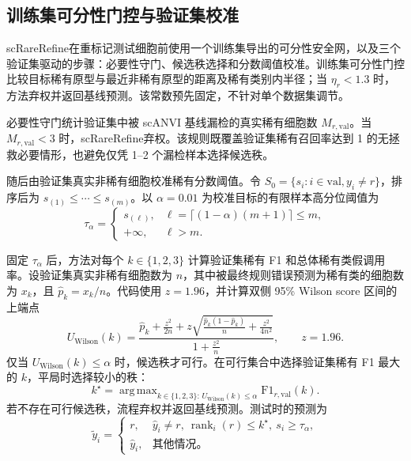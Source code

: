 \documentclass[pdflatex,sn-mathphys-num]{sn-jnl}
\theoremstyle{thmstyleone}%
\theoremstyle{thmstyletwo}%
\theoremstyle{thmstylethree}%
\newcommand{\method}{scRareRefine}
\newcommand{\rare}{r}
\newcommand{\valsplit}{\mathrm{val}}
\DeclareMathOperator*{\argmax}{arg\,max}
\begin{document}
\subsection{训练集可分性门控与验证集校准}

\method 在重标记测试细胞前使用一个训练集导出的可分性安全网，以及三个验证集驱动的步骤：必要性守门、候选秩选择和分数阈值校准。训练集可分性门控比较目标稀有原型与最近非稀有原型的距离及稀有类别内半径；当 $\eta_\rare<1.3$ 时，方法弃权并返回基线预测。该常数预先固定，不针对单个数据集调节。

必要性守门统计验证集中被 scANVI 基线漏检的真实稀有细胞数 $M_{\rare,\valsplit}$。当 $M_{\rare,\valsplit}<3$ 时，\method 弃权。该规则既覆盖验证集稀有召回率达到 1 的无拯救必要情形，也避免仅凭 1--2 个漏检样本选择候选秩。

随后由验证集真实非稀有细胞校准稀有分数阈值。令 $S_0=\{s_i:i\in\valsplit,y_i\ne\rare\}$，排序后为 $s_{(1)}\le\cdots\le s_{(m)}$。以 $\alpha=0.01$ 为校准目标的有限样本高分位阈值为\citep{vovk2005algorithmic,angelopoulos2023conformal}
\[
\tau_\alpha=
\begin{cases}
s_{(\ell)},&\ell=\lceil(1-\alpha)(m+1)\rceil\le m,\\
+\infty,&\ell>m.
\end{cases}
\]

固定 $\tau_\alpha$ 后，方法对每个 $k\in\{1,2,3\}$ 计算验证集稀有 F1 和总体稀有类假调用率。设验证集真实非稀有细胞数为 $n$，其中被最终规则错误预测为稀有类的细胞数为 $x_k$，且 $\widehat p_k=x_k/n$。代码使用 $z=1.96$，并计算双侧 95\% Wilson score 区间的上端点
\[
U_{\mathrm{Wilson}}(k)=
\frac{\widehat p_k+\frac{z^2}{2n}+z\sqrt{\frac{\widehat p_k(1-\widehat p_k)}{n}+\frac{z^2}{4n^2}}}
{1+\frac{z^2}{n}},\qquad z=1.96.
\]
仅当 $U_{\mathrm{Wilson}}(k)\le\alpha$ 时，候选秩才可行。在可行集合中选择验证集稀有 F1 最大的 $k$，平局时选择较小的秩：
\[
k^\star=\argmax_{k\in\{1,2,3\}:\,U_{\mathrm{Wilson}}(k)\le\alpha}
\mathrm{F1}_{\rare,\valsplit}(k).
\]
若不存在可行候选秩，流程弃权并返回基线预测。测试时的预测为
\[
\tilde y_i=
\begin{cases}
\rare,&\hat y_i\ne\rare,\ \operatorname{rank}_i(\rare)\le k^\star,\ s_i\ge\tau_\alpha,\\
\hat y_i,&\text{其他情况。}
\end{cases}
\]
\end{document}

